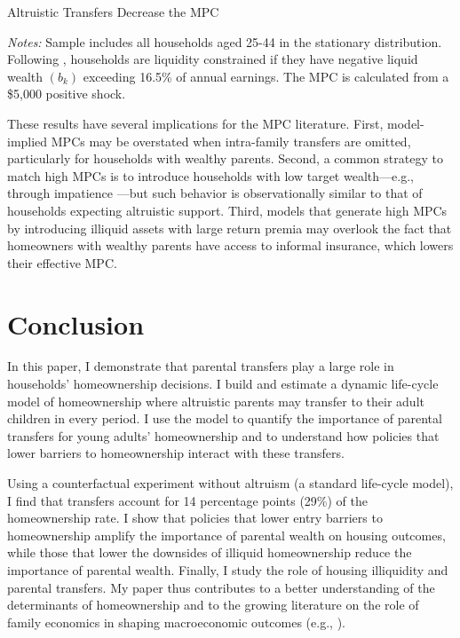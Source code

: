 \documentclass[12pt]{article}
\begin{document}
\begin{table}[tb]
	\center\singlespacing	
	\begin{threeparttable}[tb]
		\caption{Altruistic Transfers Decrease the MPC}
		
	\end{threeparttable}
	{\begin{footnotesize}\begin{flushleft}\vspace{-0.1in}
		\textit{Notes:} Sample includes all households aged 25-44 in the stationary distribution. Following \cite{Kaplan2014}, households are liquidity constrained if they have negative liquid wealth $(b_k)$ exceeding 16.5\% of annual earnings. The MPC is calculated from a \$5,000 positive shock.\end{flushleft}\end{footnotesize}}			
\end{table}

These results have several implications for the MPC literature. First, model-implied MPCs may be overstated when intra-family transfers are omitted, particularly for households with wealthy parents. Second, a common strategy to match high MPCs is to introduce households with low target wealth—e.g., through impatience \citep{aguiar2024hand}—but such behavior is observationally similar to that of households expecting altruistic support. Third, models that generate high MPCs by introducing illiquid assets with large return premia \citep{kaplan2022marginal} may overlook the fact that homeowners with wealthy parents have access to informal insurance, which lowers their effective MPC. 

\section{Conclusion}
In this paper, I demonstrate that parental transfers play a large role in households' homeownership decisions. I build and estimate a dynamic life-cycle model of homeownership where altruistic parents may transfer to their adult children in every period. I use the model to quantify the importance of parental transfers for young adults' homeownership and to understand how policies that lower barriers to homeownership interact with these transfers.

Using a counterfactual experiment without altruism (a standard life-cycle model), I find that transfers account for 14 percentage points (29\%) of the homeownership rate. I show that policies that lower entry barriers to homeownership amplify the importance of parental wealth on housing outcomes, while those that lower the downsides of illiquid homeownership reduce the importance of parental wealth. Finally, I study the role of housing illiquidity and parental transfers. My paper thus contributes to a better understanding of the determinants of homeownership and to the growing literature on the role of family economics in shaping macroeconomic outcomes (e.g., \cite{Doepke2016a,Daruich2018}).
\end{document}
